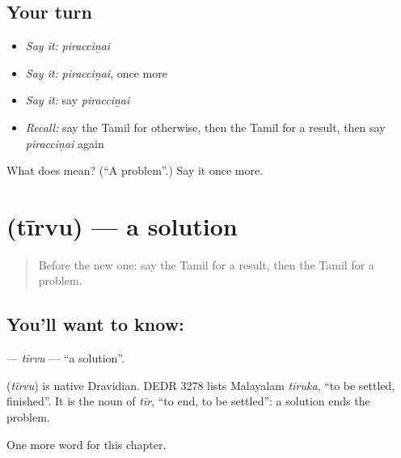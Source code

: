 \subsection*{Your turn}
\begin{itemize}
\raggedright
  \item \emph{Say it:} \emph{piracciṉai}
  \item \emph{Say it:} \emph{piracciṉai}, once more
  \item \emph{Say it:} say \emph{piracciṉai}
  \item \emph{Recall:} say the Tamil for otherwise, then the Tamil for a result, then say \emph{piracciṉai} again
\end{itemize}

\begin{tcolorbox}[breakable,colback=teal!4,colframe=teal!35!black,title={Before you move on}]
What does  mean? (\textquotedblleft{}A problem\textquotedblright{}.) Say it once more.
\end{tcolorbox}
\section[\texorpdfstring{\ta{தீர்வு} (tīrvu)}{தீர்வு (tīrvu)}]{ (tīrvu) — a solution}

\label{lesson:TA-C177-tirvu}



\begin{quote}
Before the new one: say the Tamil for a result, then the Tamil for a problem.
\end{quote}

\subsection*{You'll want to know: }
\textbf{} — \emph{tīrvu} — \textquotedblleft{}a solution\textquotedblright{}.

\begin{cousinweb}
\textbf{} (\emph{tīrvu}) is native Dravidian. DEDR 3278 lists Malayalam \emph{tīruka}, \textquotedblleft{}to be settled, finished\textquotedblright{}. It is the noun of \emph{tīr}, \textquotedblleft{}to end, to be settled\textquotedblright{}: a solution ends the problem.
\end{cousinweb}

\begin{grammarlens}[title={What you've built}]
One more word for this chapter.
\end{grammarlens}

